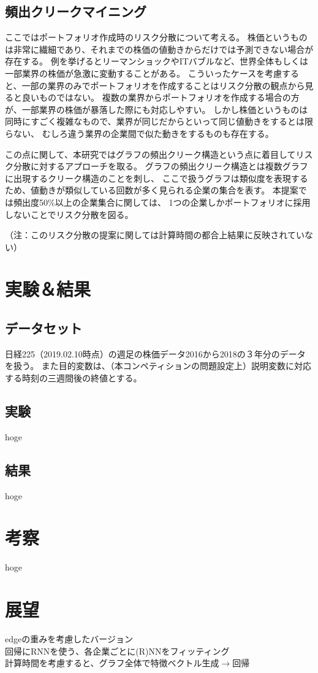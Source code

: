 \documentclass[twocolumn,10.5pt]{article}           %
\begin{document}
\subsection{頻出クリークマイニング}
ここではポートフォリオ作成時のリスク分散について考える。
株価というものは非常に繊細であり、それまでの株価の値動きからだけでは予測できない場合が存在する。
例を挙げるとリーマンショックやITバブルなど、世界全体もしくは一部業界の株価が急激に変動することがある。
こういったケースを考慮すると、一部の業界のみでポートフォリオを作成することはリスク分散の観点から見ると良いものではない。
複数の業界からポートフォリオを作成する場合の方が、一部業界の株価が暴落した際にも対応しやすい。
しかし株価というものは同時にすごく複雑なもので、業界が同じだからといって同じ値動きをするとは限らない、
むしろ違う業界の企業間で似た動きをするものも存在する。

この点に関して、本研究ではグラフの頻出クリーク構造という点に着目してリスク分散に対するアプローチを取る。
グラフの頻出クリーク構造とは複数グラフに出現するクリーク構造のことを刺し、
ここで扱うグラフは類似度を表現するため、値動きが類似している回数が多く見られる企業の集合を表す。
本提案では頻出度50\%以上の企業集合に関しては、
1つの企業しかポートフォリオに採用しないことでリスク分散を図る。

（注：このリスク分散の提案に関しては計算時間の都合上結果に反映されていない）

\section{実験＆結果}
\subsection{データセット}
日経225（2019.02.10時点）の週足の株価データ2016から2018の３年分のデータを扱う。
また目的変数は、（本コンペティションの問題設定上）説明変数に対応する時刻の三週間後の終値とする。

\subsection{実験}
hoge
\subsection{結果}
hoge

\section{考察}
hoge

\section{展望}
edgeの重みを考慮したバージョン\\
回帰にRNNを使う、各企業ごとに(R)NNをフィッティング\\
計算時間を考慮すると、グラフ全体で特徴ベクトル生成$\to$回帰



\end{document}
